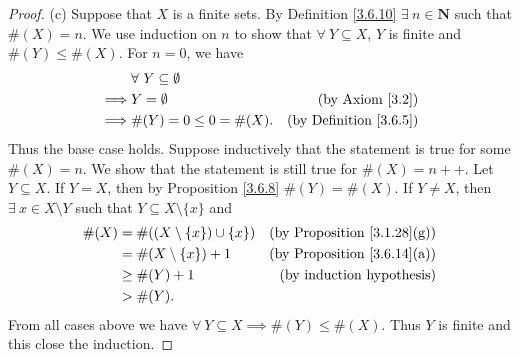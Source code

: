 \begin{proof}{(c)}
    Suppose that \(X\) is a finite sets.
    By Definition \ref{3.6.10} \(\exists\ n \in \mathbf{N}\) such that \(\#(X) = n\).
    We use induction on \(n\) to show that \(\forall\ Y \subseteq X\), \(Y\) is finite and \(\#(Y) \leq \#(X)\).
    For \(n = 0\), we have
    \begin{align*}
                 & \forall\ Y \subseteq \emptyset                                      \\
        \implies & Y = \emptyset                  & \text{(by Axiom \ref{3.2})}        \\
        \implies & \#(Y) = 0 \leq 0 = \#(X).      & \text{(by Definition \ref{3.6.5})}
    \end{align*}
    Thus the base case holds.
    Suppose inductively that the statement is true for some \(\#(X) = n\).
    We show that the statement is still true for \(\#(X) = n++\).
    Let \(Y \subseteq X\).
    If \(Y = X\), then by Proposition \ref{3.6.8} \(\#(Y) = \#(X)\).
    If \(Y \neq X\), then \(\exists\ x \in X \setminus Y\) such that \(Y \subseteq X \setminus \{x\}\) and
    \begin{align*}
        \#(X) & = \#((X \setminus \{x\}) \cup \{x\}) & \text{(by Proposition \ref{3.1.28}(g))} \\
              & = \#(X \setminus \{x\}) + 1          & \text{(by Proposition \ref{3.6.14}(a))} \\
              & \geq \#(Y) + 1                       & \text{(by induction hypothesis)}        \\
              & > \#(Y).
    \end{align*}
    From all cases above we have \(\forall\ Y \subseteq X \implies \#(Y) \leq \#(X)\).
    Thus \(Y\) is finite and this close the induction.


\end{proof}
